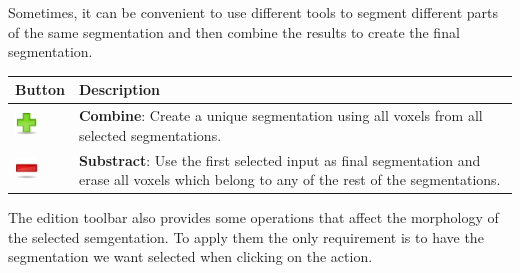Sometimes, it can be convenient to use different tools to segment different
parts of the same segmentation and then combine the results to create the final 
segmentation.\\

\vspace{0.3cm}

\begin{tabular}{| m{1.3cm} | m{12cm} |}
\hline
\textbf{Button} & \textbf{Description}\\
\hline
\includegraphics[width=0.6cm]{../../frontend/rsc/add} &
\textbf{Combine}: Create a unique segmentation using all voxels from all
selected segmentations.\\
\hline
\includegraphics[width=0.6cm]{../../frontend/rsc/remove} &
\textbf{Substract}: Use the first selected input as final segmentation and erase
all voxels which belong to any of the rest of the segmentations.\\
\hline
\end{tabular}
\vspace{0.3cm}

The edition toolbar also provides some operations that affect the morphology of the 
selected semgentation. To apply them the only requirement is to have the segmentation
we want selected when clicking on the action.\\
\vspace{0.3cm}

